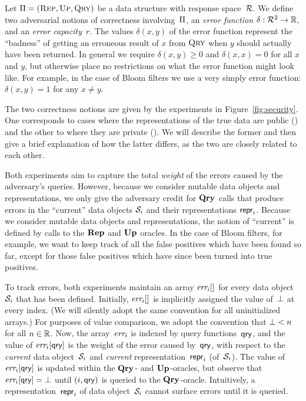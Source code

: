


Let $\mathrm{\Pi}=(\textnormal{\textsc{Rep}},\textnormal{\textsc{Up}},\textnormal{\textsc{Qry}})$ be a data structure with response space~$\mathcal{R}$.
%
We define two adversarial notions of correctness involving~$\mathrm{\Pi}$, an
\emph{error function} $\delta:\mathcal{R}^2 \to \mathbb{R}$, and an \emph{error capacity}~$r$.
The values $\delta(x,y)$ of the error function represent the ``badness'' of
getting an erroneous result of $x$ from $\textnormal{\textsc{Qry}}$ when $y$ should actually have
been returned. In general we require $\delta(x,y) \geq 0$ and $\delta(x,x) = 0$
for all $x$ and $y$, but otherwise place no restrictions on what the error
function might look like. For example, in the case of Bloom filters we use a
very simply error function: $\delta(x,y) = 1$ for any $x \ne y$.

The two correctness notions are given by the experiments in
Figure~\ref{fig:security}. One corresponds to cases where the representations of
the true data are public (\errep) and the other to where they are private
(\erreps). We will describe the former and then give a brief explanation of how
the latter differs, as the two are closely related to each other.

Both experiments aim to capture the total \emph{weight} of the errors caused by
the adversary's queries. However, because we consider mutable data objects and
representations, we only give the adversary credit for $\textup{\textbf{Qry}}\hspace{0.5pt}$ calls that
produce errors in the ``current'' data objects $\mathcal{S}_i$ and their
representations $\mathsf{repr}_i$. Because we consider mutable data objects and
representations, the notion of ``current'' is defined by calls to the $\textup{\textbf{Rep}}\hspace{0.5pt}$
and $\textup{\textbf{Up}}\hspace{0.5pt}$ oracles. In the case of Bloom filters, for example, we want to
keep track of all the false positives which have been found so far, except for
those false positives which have since been turned into true positives.

To track errors, both experiments maintain an array $\textit{err}_i[]$ for every data
object~$\mathcal{S}_i$ that has been defined.  Initially, $\textit{err}_i[]$ is implicitly
assigned the value of~$\bot$ at every index. (We will silently adopt the
same convention for all uninitialized arrays.) For purposes of value
comparison, we adopt the convention that $\bot < n$ for all $n \in \mathbb{R}$.
%
Now, the array~$\textit{err}_i$ is indexed by query functions~$\mathsf{qry}$, and the value of
$\textit{err}_i[\mathsf{qry}]$ is the weight of the error caused by~$\mathsf{qry}$, with respect to
the \emph{current} data object~$\mathcal{S}_i$ and \emph{current}
representation~$\mathsf{repr}_i$ (of~$\mathcal{S}_i$).
%
The value of~$\textit{err}_i[\mathsf{qry}]$ is updated within the $\textup{\textbf{Qry}}\hspace{0.5pt}$- and $\textup{\textbf{Up}}\hspace{0.5pt}$-oracles,
but observe that $\textit{err}_i[\mathsf{qry}] = \bot$ until $(i,\mathsf{qry})$ is queried to the
$\textup{\textbf{Qry}}\hspace{0.5pt}$-oracle.  Intuitively, a representation~$\mathsf{repr}_i$ of data object~$\mathcal{S}_i$
cannot surface errors until it is queried.


